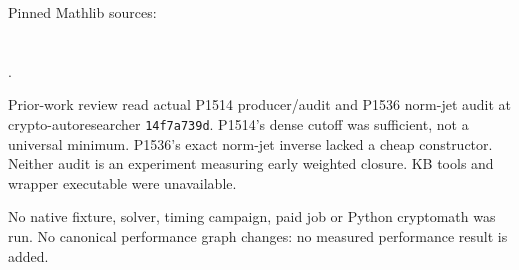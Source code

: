 \documentclass[10pt]{article}
\begin{document}
Pinned Mathlib sources:\\
\\
\\
.


Prior-work review read actual P1514 producer/audit and P1536 norm-jet audit
at crypto-autoresearcher \texttt{14f7a739d}. P1514's dense cutoff was
sufficient, not a universal minimum. P1536's exact norm-jet inverse lacked
a cheap constructor. Neither audit is an experiment measuring early
weighted closure. KB tools and wrapper executable were unavailable.

No native fixture, solver, timing campaign, paid job or Python cryptomath
was run. No canonical performance graph changes: no measured performance
result is added.
\end{document}
